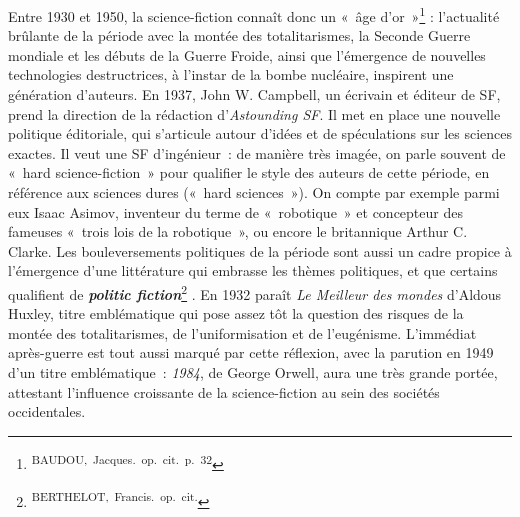 \documentclass[letterpaper,portrait,12pt]{article}
\begin{document}
	Entre 1930 et 1950, la science-fiction conna\^{i}t donc un « \^{a}ge d'or »\footnote{\textsuperscript{\newpage
}\textsuperscript{	BAUDOU,\ Jacques.\ op.\ cit.\ p.\ 32}} : l'actualit\'{e} br\^{u}lante de la p\'{e}riode avec la mont\'{e}e des totalitarismes, la Seconde Guerre mondiale et les d\'{e}buts de la Guerre Froide, ainsi que l'\'{e}mergence de nouvelles technologies destructrices, \`{a} l'instar de la bombe nucl\'{e}aire, inspirent une g\'{e}n\'{e}ration d'auteurs. En 1937, John W. Campbell, un \'{e}crivain et \'{e}diteur de SF, prend la direction de la r\'{e}daction d'\emph{Astounding SF}. Il met en place une nouvelle politique \'{e}ditoriale, qui s'articule autour d'id\'{e}es et de sp\'{e}culations sur les sciences exactes. Il veut une SF d'ing\'{e}nieur : de mani\`{e}re tr\`{e}s imag\'{e}e, on parle souvent de « hard science-fiction » pour qualifier le style des auteurs de cette p\'{e}riode, en r\'{e}f\'{e}rence aux sciences dures (« hard sciences »). On compte par exemple parmi eux Isaac Asimov, inventeur du terme de « robotique » et concepteur des fameuses « trois lois de la robotique », ou encore le britannique Arthur C. Clarke. Les bouleversements politiques de la p\'{e}riode sont aussi un cadre propice \`{a} l'\'{e}mergence d'une litt\'{e}rature qui embrasse les th\`{e}mes politiques, et que certains qualifient de \textbf{\emph{politic fiction}}\footnote{\textsuperscript{\newpage
}\textsuperscript{	BERTHELOT,\ Francis.\ op.\ cit.}} . En 1932 para\^{i}t\emph{ Le Meilleur des mondes }d'Aldous Huxley, titre embl\'{e}matique qui pose assez t\^{o}t la question des risques de la mont\'{e}e des totalitarismes, de l'uniformisation et de l'eug\'{e}nisme. L'imm\'{e}diat apr\`{e}s-guerre est tout aussi marqu\'{e} par cette r\'{e}flexion, avec la parution en 1949 d'un titre embl\'{e}matique : \emph{1984}, de George Orwell, aura une tr\`{e}s grande port\'{e}e, attestant l'influence croissante de la science-fiction au sein des soci\'{e}t\'{e}s occidentales. 
\end{document}
